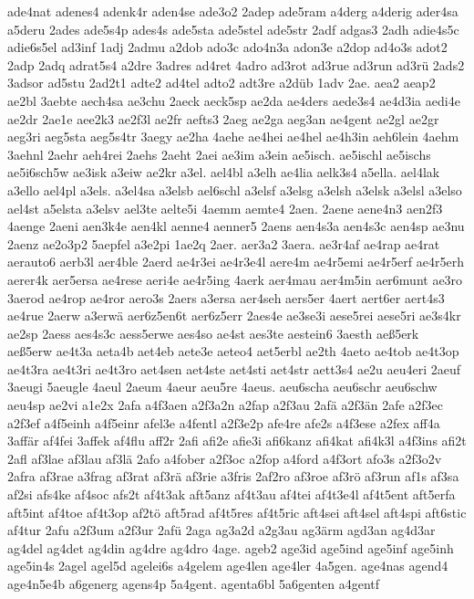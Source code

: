 {ade4nat
adenes4
adenk4r
aden4se
ade3o2
2adep
ade5ram
a4derg
a4derig
ader4sa
a5deru
2ades
ade5s4p
ades4s
ade5sta
ade5stel
ade5str
2adf
adgas3
2adh
adie4s5c
adie6s5el
ad3inf
1adj
2admu
a2dob
ado3c
ado4n3a
adon3e
a2dop
ad4o3s
adot2
2adp
2adq
adrat5s4
a2dre
3adres
ad4ret
4adro
ad3rot
ad3rue
ad3run
ad3rü
2ads2
3adsor
ad5stu
2ad2t1
adte2
ad4tel
adto2
adt3re
a2düb
1adv
2ae.
aea2
aeap2
ae2bl
3aebte
aech4sa
ae3chu
2aeck
aeck5sp
ae2da
ae4ders
aede3s4
ae4d3ia
aedi4e
ae2dr
2ae1e
aee2k3
ae2f3l
ae2fr
aefts3
2aeg
ae2ga
aeg3an
ae4gent
ae2gl
ae2gr
aeg3ri
aeg5sta
aeg5s4tr
3aegy
ae2ha
4aehe
ae4hei
ae4hel
ae4h3in
aeh6lein
4aehm
3aehnl
2aehr
aeh4rei
2aehs
2aeht
2aei
ae3im
a3ein
ae5isch.
ae5ischl
ae5ischs
ae5i6sch5w
ae3isk
a3eiw
ae2kr
a3el.
ael4bl
a3elh
ae4lia
aelk3s4
a5ella.
ael4lak
a3ello
ael4pl
a3els.
a3el4sa
a3elsb
ael6schl
a3elsf
a3elsg
a3elsh
a3elsk
a3elsl
a3elso
ael4st
a5elsta
a3elsv
ael3te
aelte5i
4aemm
aemte4
2aen.
2aene
aene4n3
aen2f3
4aenge
2aeni
aen3k4e
aen4kl
aenne4
aenner5
2aens
aen4s3a
aen4s3c
aen4sp
ae3nu
2aenz
ae2o3p2
5aepfel
a3e2pi
1ae2q
2aer.
aer3a2
3aera.
ae3r4af
ae4rap
ae4rat
aerauto6
aerb3l
aer4ble
2aerd
ae4r3ei
ae4r3e4l
aere4m
ae4r5emi
ae4r5erf
ae4r5erh
aerer4k
aer5ersa
ae4rese
aeri4e
ae4r5ing
4aerk
aer4mau
aer4m5in
aer6munt
ae3ro
3aerod
ae4rop
ae4ror
aero3s
2aers
a3ersa
aer4seh
aers5er
4aert
aert6er
aert4s3
ae4rue
2aerw
a3erwä
aer6z5en6t
aer6z5err
2aes4e
ae3se3i
aese5rei
aese5ri
ae3s4kr
ae2sp
2aess
aes4s3c
aess5erwe
aes4so
ae4st
aes3te
aestein6
3aesth
aeß5erk
aeß5erw
ae4t3a
aeta4b
aet4eb
aete3e
aeteo4
aet5erbl
ae2th
4aeto
ae4tob
ae4t3op
ae4t3ra
ae4t3ri
ae4t3ro
aet4sen
aet4ste
aet4sti
aet4str
aett3s4
ae2u
aeu4eri
2aeuf
3aeugi
5aeugle
4aeul
2aeum
4aeur
aeu5re
4aeus.
aeu6scha
aeu6schr
aeu6schw
aeu4sp
ae2vi
a1e2x
2afa
a4f3aen
a2f3a2n
a2fap
a2f3au
2afä
a2f3än
2afe
a2f3ec
a2f3ef
a4f5einh
a4f5einr
afel3e
a4fentl
a2f3e2p
afe4re
afe2s
a4f3ese
a2fex
aff4a
3affär
af4fei
3affek
af4flu
aff2r
2afi
afi2e
afie3i
afi6kanz
afi4kat
afi4k3l
a4f3ins
afi2t
2afl
af3lae
af3lau
af3lä
2afo
a4fober
a2f3oc
a2fop
a4ford
a4f3ort
afo3s
a2f3o2v
2afra
af3rae
a3frag
af3rat
af3rä
af3rie
a3fris
2af2ro
af3roe
af3rö
af3run
af1s
af3sa
af2si
afs4ke
af4soc
afs2t
af4t3ak
aft5anz
af4t3au
af4tei
af4t3e4l
af4t5ent
aft5erfa
aft5int
af4toe
af4t3op
af2tö
aft5rad
af4t5res
af4t5ric
aft4sei
aft4sel
aft4spi
aft6stic
af4tur
2afu
a2f3um
a2f3ur
2afü
2aga
ag3a2d
a2g3au
ag3ärm
agd3an
ag4d3ar
ag4del
ag4det
ag4din
ag4dre
ag4dro
4age.
ageb2
age3id
age5ind
age5inf
age5inh
age5in4s
2agel
agel5d
agelei6s
a4gelem
age4len
age4ler
4a5gen.
age4nas
agend4
age4n5e4b
a6generg
agens4p
5a4gent.
agenta6bl
5a6genten
a4gentf
}
